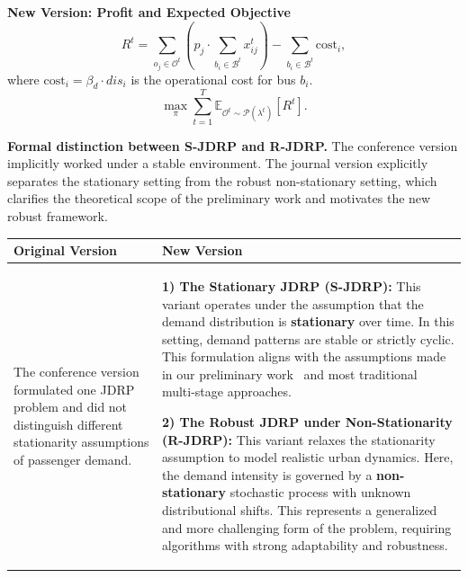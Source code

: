\documentclass[11pt, a4paper]{article}
\begin{document}
\begin{itemize}
    \begin{boxedminipage}[htbp]{\linewidth}
    \vspace{2mm}
    \noindent \textbf{New Version: Profit and Expected Objective}
    \begin{equation}
        R^t = \sum_{o_j \in \mathcal{O}^t} \left( p_j \cdot \sum_{b_i \in \mathcal{B}^t} x_{ij}^t \right) - \sum_{b_i \in \mathcal{B}^t} \text{cost}_i,
    \end{equation}
    where $\text{cost}_i = \beta_d \cdot dis_i$ is the operational cost for bus $b_i$.
    \begin{equation}
        \max_{\pi} \sum_{t=1}^T \mathbb{E}_{\mathcal{O}^t \sim \mathcal{P}(\lambda^t)}\left[R^t\right].
    \end{equation}
    \vspace{1mm}
    \end{boxedminipage}

    \textbf{Formal distinction between S-JDRP and R-JDRP.} The conference version implicitly worked under a stable environment. The journal version explicitly separates the stationary setting from the robust non-stationary setting, which clarifies the theoretical scope of the preliminary work and motivates the new robust framework.

    \begin{tabular}{|p{}|p{}|}
        \hline
        \textbf{Original Version} & \textbf{New Version}\\
        \hline
        The conference version formulated one JDRP problem and did not distinguish different stationarity assumptions of passenger demand. &
        \textbf{1) The Stationary JDRP (S-JDRP):} This variant operates under the assumption that the demand distribution is \textbf{stationary} over time. In this setting, demand patterns are stable or strictly cyclic. This formulation aligns with the assumptions made in our preliminary work~\cite{ref:odrp} and most traditional multi-stage approaches.

        \textbf{2) The Robust JDRP under Non-Stationarity (R-JDRP):} This variant relaxes the stationarity assumption to model realistic urban dynamics. Here, the demand intensity is governed by a \textbf{non-stationary} stochastic process with unknown distributional shifts. This represents a generalized and more challenging form of the problem, requiring algorithms with strong adaptability and robustness.\\
        \hline
    \end{tabular}


\end{itemize}
\end{document}
